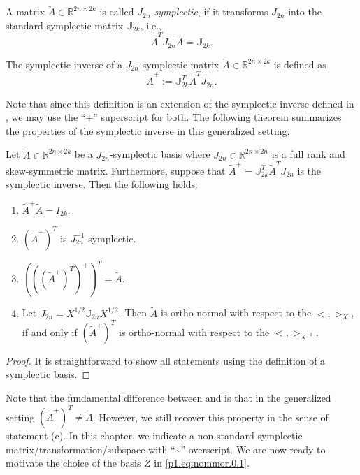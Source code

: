 \begin{definition}
A matrix $\tilde A\in \mathbb R^{2n\times 2k}$ is called \emph{$J_{2n}$-symplectic}, if it transforms $J_{2n}$ into the standard symplectic matrix $\mathbb J_{2k}$, i.e.,
\begin{equation} \label{p1.eq:nommor.0.3}
	\tilde A^T J_{2n} \tilde A = \mathbb J_{2k}.
\end{equation}
\end{definition}

\begin{definition}
The symplectic inverse of a $J_{2n}$-symplectic matrix $\tilde A\in \mathbb R^{2n\times 2k}$ is defined as
\begin{equation} \label{p1.eq:nommor.0.4}
	\tilde A^{+} := \mathbb J_{2k}^T \tilde A^T J_{2n}.
\end{equation}
\end{definition}
Note that since this definition is an extension of the symplectic inverse defined in , we may use the ``$+$'' superscript for both. The following theorem summarizes the properties of the symplectic inverse in this generalized setting.

\begin{proposition}%
Let $\tilde A\in \mathbb R^{2n\times 2k}$ be a $J_{2n}$-symplectic basis where $J_{2n}\in\mathbb R^{2n\times 2n}$ is a full rank and skew-symmetric matrix. Furthermore, suppose that $\tilde A^{+} = \mathbb{J}_{2k}^T \tilde A^T J_{2n}$ is the symplectic inverse. Then the following holds:
\begin{enumerate}%
\item $\tilde A^+ \tilde A = I_{2k}$.
\item $(\tilde A^+)^T$ is $J_{2n}^{-1}$-symplectic.
\item $\left(\left(\left(\tilde A^+\right)^T\right)^+\right)^T = \tilde A$.
\item Let $J_{2n}=X^{1/2}\mathbb J_{2n} X^{1/2}$. Then $\tilde A$ is ortho-normal with respect to the $<,>_X$, if and only if $(\tilde A^+)^T$ is ortho-normal with respect to the $<,>_{X^{-1}}$.
\end{enumerate}
\end{proposition}
\begin{proof}
It is straightforward to show all statements using the definition of a symplectic basis.
\end{proof}

Note that the fundamental difference between  and  is that in the generalized setting $(\tilde A^+)^T \neq \tilde A$. However, we still recover this property in the sense of statement (c). In this chapter, we indicate a non-standard symplectic matrix/transformation/subspace with ``\textasciitilde'' overscript. We are now ready to motivate the choice of the basis $\tilde Z$ in \eqref{p1.eq:nommor.0.1}.

